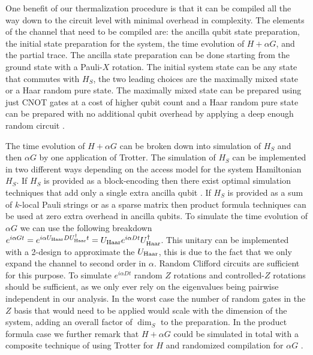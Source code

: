 One benefit of our thermalization procedure is that it can be compiled all the way down to the circuit level with minimal overhead in complexity. The elements of the channel that need to be compiled are: the ancilla qubit state preparation, the initial state preparation for the system, the time evolution of $H + \alpha G$, and the partial trace. The ancilla state preparation can be done starting from the ground state with a Pauli-$X$ rotation. The initial system state can be any state that commutes with $H_S$, the two leading choices are the maximally mixed state or a Haar random pure state. The maximally mixed state can be prepared using just CNOT gates at a cost of higher qubit count and a Haar random pure state can be prepared with no additional qubit overhead by applying a deep enough random circuit \cite{choi2023preparing}. 

The time evolution of $H + \alpha G$ can be broken down into simulation of $H_S$ and then $\alpha G$ by one application of Trotter. The simulation of $H_S$ can be implemented in two different ways depending on the access model for the system Hamiltonian $H_S$. If $H_S$ is provided as a block-encoding then there exist optimal simulation techniques that add only a single extra ancilla qubit \cite{low2019hamiltonian}. If $H_S$ is provided as a sum of $k$-local Pauli strings or as a sparse matrix then product formula techniques can be used \cite{childs2021theory} at zero extra overhead in ancilla qubits. To simulate the time evolution of $\alpha G$ we can use the following breakdown $e^{i \alpha G t} = e^{i \alpha U_{\text{Haar}} D U_{\text{Haar}}^\dagger t} = U_{\text{Haar}} e^{i \alpha  D  t}U_{\text{Haar}}^\dagger$. This unitary can be implemented with a 2-design to approximate the $U_{\text{Haar}}$, this is due to the fact that we only expand the channel to second order in $\alpha$. Random Clifford circuits \cite{webb2015clifford} are sufficient for this purpose. To simulate $e^{i \alpha D t}$ random $Z$ rotations and controlled-$Z$ rotations should be sufficient, as we only ever rely on the eigenvalues being pairwise independent in our analysis. In the worst case the number of random gates in the $Z$ basis that would need to be applied would scale with the dimension of the system, adding an overall factor of $\dim_S$ to the preparation. In the product formula case we further remark that $H + \alpha G$ could be simulated in total with a composite technique of using Trotter for $H$ and randomized compilation for $\alpha G$ \cite{hagan2023composite}. 

